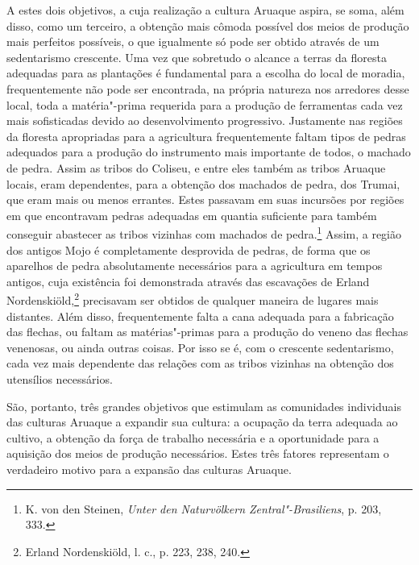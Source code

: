 A estes dois objetivos, a cuja realização a cultura Aruaque aspira, se
soma, além disso, como um terceiro, a obtenção mais cômoda possível dos
meios de produção mais perfeitos possíveis, o que igualmente só pode
ser obtido através de um sedentarismo crescente. Uma vez que sobretudo
o alcance a terras da floresta adequadas para as plantações é
fundamental para a escolha do local de moradia, frequentemente não pode
ser encontrada, na própria natureza nos arredores desse local, toda a
matéria"-prima requerida para a produção de ferramentas cada vez mais
sofisticadas devido ao desenvolvimento progressivo. Justamente nas
regiões da floresta apropriadas para a agricultura frequentemente
faltam tipos de pedras adequados para a produção do instrumento mais
importante de todos, o machado de pedra. Assim as tribos do Coliseu, e
entre eles também as tribos Aruaque locais, eram dependentes, para a
obtenção dos machados de pedra, dos Trumai, que eram mais ou menos
errantes. Estes passavam em suas incursões por regiões em que
encontravam pedras adequadas em quantia suficiente para também conseguir
abastecer as tribos vizinhas com machados de pedra.\footnote{K. von den
  Steinen, \emph{Unter den Naturvölkern Zentral"-Brasiliens}, p. 203,
  333.} Assim, a região dos antigos Mojo é completamente desprovida de
pedras, de forma que os aparelhos de pedra absolutamente necessários
para a agricultura em tempos antigos, cuja existência foi demonstrada
através das escavações de Erland Nordenskiöld,\footnote{Erland
  Nordenskiöld, l. c., p. 223, 238, 240.} precisavam ser obtidos de
qualquer maneira de lugares mais distantes. Além disso, frequentemente
falta a cana adequada para a fabricação das flechas, ou faltam as
matérias"-primas para a produção do veneno das flechas venenosas, ou
ainda outras coisas. Por isso se é, com o crescente sedentarismo, cada
vez mais dependente das relações com as tribos vizinhas na obtenção dos
utensílios necessários.

São, portanto, três grandes objetivos que estimulam as comunidades
individuais das culturas Aruaque a expandir sua cultura: a ocupação da
terra adequada ao cultivo, a obtenção da força de trabalho necessária e
a oportunidade para a aquisição dos meios de produção necessários. Estes
três fatores representam o verdadeiro motivo para a expansão das
culturas Aruaque.

